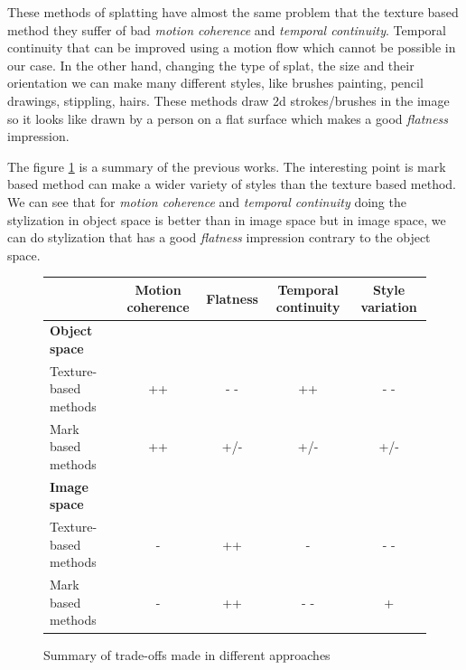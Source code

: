 These methods of splatting have almost the same problem that the texture based method they suffer of bad \textit{motion coherence} and \textit{temporal continuity}. Temporal continuity that can be improved using a motion flow which cannot be possible in our case. In the other hand, changing the type of splat, the size and their orientation we can make many different styles, like brushes painting, pencil drawings, stippling, hairs. These methods draw 2d strokes/brushes in the image so it looks like drawn by a person on a flat surface which makes a good \textit{flatness} impression. \newline



%

The figure \ref{tableau_comparatif} is a summary of the previous works. The interesting point is mark based method can make a wider variety of styles than the texture based method. We can see that for \textit{motion coherence} and \textit{temporal continuity} doing the stylization in object space is better than in image space but in image space, we can do stylization that has a good \textit{flatness} impression contrary to the object space.


\begin{figure}[H]

    \begin{tabular}{|l|*{4}{c|}}
    \hline
         & \textbf{Motion coherence} & \textbf{Flatness} & \textbf{Temporal continuity} & \textbf{Style variation} \\
    \hline
    \textbf{Object space} & & & & \\
    \hline
    Texture-based methods & ++ & - - & ++ & - - \\
    \hline
    Mark based methods & ++ & +/- & +/- & +/- \\
    \hline
    \textbf{Image space} & & & & \\
    \hline
    Texture-based methods & -  & ++ & - & - - \\
    \hline
    Mark based methods & - & ++ & - - & + \\
    \hline
    \end{tabular}

    \caption{Summary of trade-offs made in different approaches}
    \label{tableau_comparatif}
\end{figure}

